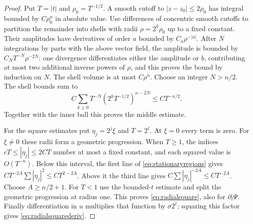 \documentclass[11pt,oneside]{article}
\theoremstyle{definition}\newtheorem{definition}[theorem]{Definition}
\theoremstyle{remark}\newtheorem{remark}[theorem]{Remark}
\begin{document}
\begin{proof}
Put $T=|t|$ and $\rho_0=T^{-1/2}$. A smooth cutoff to
$|z-z_0|\leq2\rho_0$ has integral bounded by $C\rho_0^n$ in absolute value.
Use differences of concentric smooth cutoffs to partition the remainder
into shells with radii $\rho=2^k\rho_0$ up to a fixed constant. Their
amplitudes have derivatives of order $a$ bounded by $C_a\rho^{-|a|}$.
After $N$ integrations by parts with the above vector field, the amplitude
is bounded by $C_NT^{-N}\rho^{-2N}$: one divergence differentiates either
the amplitude or $b$, contributing at most two additional inverse powers of
$\rho$, and this proves the bound by induction on $N$. The shell volume is
at most $C\rho^n$. Choose an integer $N>n/2$. The shell bounds sum to
\[
 C\sum_{k\geq0}T^{-N}(2^kT^{-1/2})^{n-2N}
 \leq CT^{-n/2}.
\]
Together with the inner ball this proves the middle estimate.

For the square estimates put $\eta_j=2^j\xi$ and $T=2^\ell$. At $\xi=0$
every term is zero. For $\xi\ne0$ these radii form a geometric progression.
When $T\geq1$, the indices $cT\leq|\eta_j|\leq2CT$ number at most a fixed
constant, and each squared value is $O(T^{-n})$. Below this interval, the
first line of \eqref{eq:stationaryregions} gives
$C T^{-2A}\sum |\eta_j|^2\leq CT^{2-2A}$. Above it the third line gives
$C\sum |\eta_j|^{-2A}\leq CT^{-2A}$. Choose $A\geq n/2+1$.
For $T<1$ use the bounded-$t$ estimate and split the geometric progression
at radius one. This proves \eqref{eq:radialsquare}, also for $\partial_t\Psi$.
Finally differentiation in $u$ multiplies that function by $\sigma2^\ell$;
squaring this factor gives \eqref{eq:radialsquarederiv}.
\end{proof}
\end{document}
